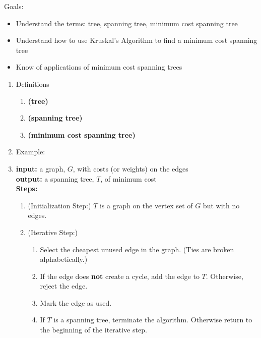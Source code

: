 \documentclass[12pt]{article}
\renewcommand{\emph}[1]{\textsf{\textbf{#1}}}
\begin{document}
Goals:
\begin{itemize}
\item Understand the terms: tree, spanning tree, minimum cost spanning tree
\item Understand how to use Kruskal's Algorithm to find a minimum cost spanning tree
\item Know of applications of minimum cost spanning trees
\end{itemize}
\begin{enumerate}
\item Definitions
	\begin{enumerate}
	\item \textbf{(tree)}
	\vfill
	\item \textbf{(spanning tree)}
	\vfill
	\item \textbf{(minimum cost spanning tree)}
	\vfill
	\end{enumerate}
\item Example: \\

\newpage
\item
{}

\textbf{input:} a graph, $G$, with costs (or weights) on the edges\\
\textbf{output:} a spanning tree, $T$, of minimum cost\\
\textbf{Steps:}
\begin{enumerate}
	\item (Initialization Step:) $T$ is a graph on the vertex set of $G$ but with no edges.
	\item (Iterative Step:) 
		\begin{enumerate}
		\item Select the cheapest unused edge in the graph. (Ties are broken alphabetically.)
		\item If the edge does \emph{not} create a cycle, add the edge to $T$. Otherwise, reject the edge.
		\item Mark the edge as used.
		\item If $T$ is a spanning tree, terminate the algorithm. Otherwise return to the beginning of the iterative step.
		\end{enumerate}
\end{enumerate}


\end{enumerate}
\end{document}
